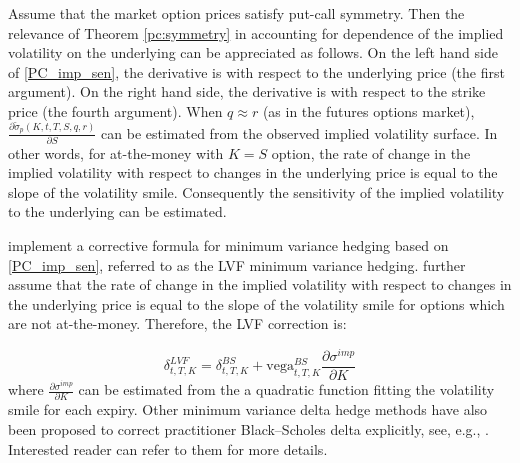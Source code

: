 \documentclass[letterpaper,12pt,titlepage,oneside,final]{book}
\numberwithin{equation}{section}
\theoremstyle{definition}
\newcommand{\impsigma}{\breve{\sigma}}
\begin{document}
Assume that the market option prices satisfy put-call symmetry. Then
the relevance of Theorem \ref{pc:symmetry} in accounting for dependence of the implied volatility on the underlying can be appreciated as follows.
On the left hand side of \eqref{PC_imp_sen}, the derivative is with respect to  the underlying price (the first argument). On the right hand side, the derivative is with respect to the strike price (the fourth argument).
When $q \approx r$ (as in the futures options market), $\frac{\partial \impsigma_p(K, t,T,S , q, r)}{\partial S}$ can be estimated from the observed implied volatility surface. In other words, for at-the-money with $K=S$ option, the rate of change in the implied volatility with respect to changes in the underlying price is equal to the slope of the volatility smile.
Consequently the sensitivity of the implied volatility to the underlying  can be estimated. 

\citet{hulloptimal}  implement a corrective formula for minimum variance hedging  based on  \eqref{PC_imp_sen}, referred to as the LVF minimum variance hedging. \citet{hulloptimal} further assume that the rate of change in the implied volatility with respect to changes in the underlying price is equal to the slope of the volatility smile  for options which are not at-the-money. Therefore, the LVF correction is:

    \begin{equation}
        \delta^{LVF}_{t,T,K}=\delta^{BS}_{t,T,K}+\text{vega}^{BS}_{t,T,K} \frac{\partial \sigma^{imp}}{\partial K}
        \label{eq:HullWhiteLVF}
    \end{equation}  
where  $\frac{\partial \sigma^{imp}}{\partial K}$ can be estimated from the  a quadratic function fitting the volatility smile for each expiry. Other minimum variance delta hedge methods have also been proposed to correct practitioner Black–Scholes delta explicitly, see, e.g., \citep{bakshi1997empirical,crepey2004,barlett2006,poulsen2009,alexander2012}. Interested reader can refer to them for more details.
\end{document}
